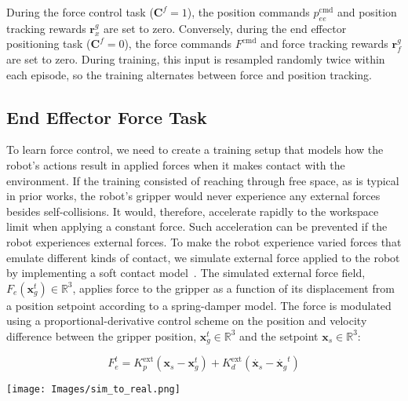 During the force control task ($\mathbf{C}^f = 1$), the position commands $p^\textrm{cmd}_{ee}$ and position tracking rewards $\mathbf{r}_x^g$ are set to zero. Conversely, during the end effector positioning task ($\mathbf{C}^f = 0$), the force commands $F^\textrm{cmd}$ and force tracking rewards $\mathbf{r}_f^g$ are set to zero. During training, this input is resampled randomly twice within each episode, so the training alternates between force and position tracking.


\subsection{End Effector Force Task} \label{sec:force_control}
\label{sec:force_controller}

To learn force control, we need to create a training setup that models how the robot's actions result in applied forces when it makes contact with the environment. If the training consisted of reaching through free space, as is typical in prior works, the robot's gripper would never 
experience any external forces besides self-collisions. It would, therefore, accelerate rapidly to the workspace limit when applying a constant force. 
Such acceleration can be prevented if the robot experiences external forces. To make the robot experience varied forces that emulate different kinds of contact, we simulate external force applied to the robot by implementing a soft contact model~\cite{nagurka2004mass}. 
The simulated external force field, $F_e(\mathbf{x}_g^t) \in \mathbb{R}^3$, applies force to the gripper as a function of its displacement from a position setpoint according to a spring-damper model.
The force is modulated using a proportional-derivative control scheme on the position and velocity difference between the gripper position, $\mathbf{x}_g^t \in \mathbb{R}^3$ and the setpoint $\mathbf{x}_s\in \mathbb{R}^3$:

\begin{equation}
    F_e^t = K_p^\textrm{ext} (\mathbf{x}_s - \mathbf{x}_g^t) + K_d^\textrm{ext} (\Dot{\mathbf{x}_s} - \Dot{\mathbf{x}_g}^t)
\end{equation}

\begin{figure*}[ht!]
    \vspace{0.3cm}
    \centering
    \texttt{[image: Images/sim\_to\_real.png]}\hfill
    \caption{\textbf{Real-world deployment.} We deploy our policy in a variety of real-world scenarios: (A) water pouring in a kitchenette; (B) tracking a long end effector trajectory in position control mode with performance verified by motion capture; (C) outdoor whole-body reaching; (D, E) quantitative measurement of the force application control by pulling down on a dynamometer; (F) lifting a \SI{4}{\kilo\gram} box while maintaining compliance in the gripper, showcasing gravity compensation. In subfigure (D), each line represents the mean across five force setpoints, with the shaded area indicating the standard deviation.
    }\label{fig:sim_to_real}
\vspace{-0.4cm}
\end{figure*}


